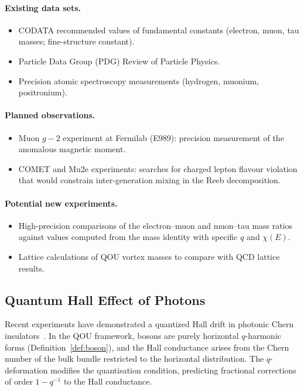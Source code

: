 \paragraph{Existing data sets.}
\begin{itemize}
  \item CODATA recommended values of fundamental constants (electron, muon,
        tau masses; fine-structure constant).
  \item Particle Data Group (PDG) Review of Particle Physics.
  \item Precision atomic spectroscopy measurements (hydrogen, muonium,
        positronium).
\end{itemize}

\paragraph{Planned observations.}
\begin{itemize}
  \item Muon $g-2$ experiment at Fermilab (E989): precision measurement of
        the anomalous magnetic moment.
  \item COMET and Mu2e experiments: searches for charged lepton flavour
        violation that would constrain inter-generation mixing in the Reeb
        decomposition.
\end{itemize}

\paragraph{Potential new experiments.}
\begin{itemize}
  \item High-precision comparisons of the electron--muon and muon--tau mass
        ratios against values computed from the mass identity with specific
        $q$ and $\chi(E)$.
  \item Lattice calculations of QOU vortex masses to compare with QCD
        lattice results.
\end{itemize}

\subsection{Quantum Hall Effect of Photons}
\label{sec:quantum-hall-photons}

\begin{remark}
\label{rem:photonic-hall}
Recent experiments have demonstrated a quantized Hall drift in photonic Chern
insulators~\cite{chenier2026}.  In the QOU framework, bosons are purely
horizontal $q$-harmonic forms (Definition~\ref{def:boson}), and the Hall
conductance arises from the Chern number of the bulk bundle restricted to the
horizontal distribution.  The $q$-deformation modifies the quantisation
condition, predicting fractional corrections of order $1 - q^{-1}$ to the Hall
conductance.
\end{remark}

